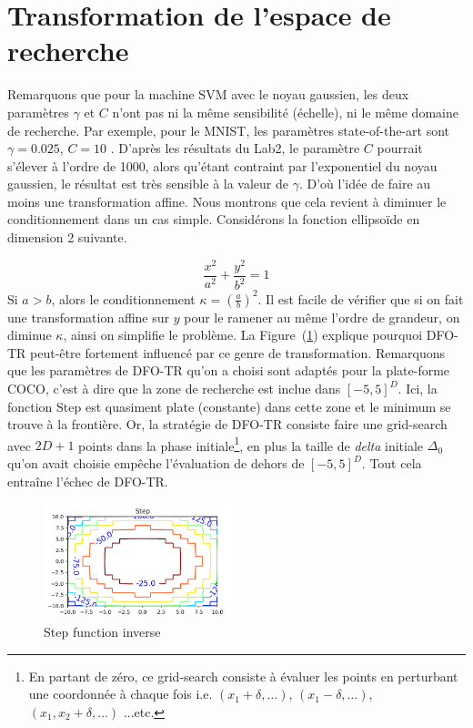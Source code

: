 \documentclass[12 pt, a4paper]{article}
\begin{document}
\section{Transformation de l'espace de recherche}\label{transform}
Remarquons que pour la machine SVM avec le noyau gaussien, les deux paramètres $\gamma$ et $C$ n'ont pas ni la même sensibilité (échelle), ni le même domaine de recherche. Par exemple, pour le MNIST, les paramètres state-of-the-art sont $\gamma = 0.025$, $C = 10$ \cite{results}. D'après les résultats du Lab2, le paramètre $C$ pourrait s'élever à l'ordre de 1000, alors qu'étant contraint par l'exponentiel du noyau gaussien, le résultat est très sensible à la valeur de $\gamma$. D'où l'idée de faire au moins une transformation affine. Nous montrons que cela revient à diminuer le conditionnement dans un cas simple. Considérons la fonction ellipsoïde en dimension 2 suivante. 

\begin{equation*}
\frac{x^2}{a^2} + \frac{y^2}{b^2} = 1
\end{equation*}
Si $a>b$, alors le conditionnement $\kappa = (\frac{a}{b})^2$. Il est facile de vérifier que si on fait une transformation affine sur $y$ pour le ramener au même l'ordre de grandeur, on diminue $\kappa$, ainsi on simplifie le problème. La Figure~(\ref{fig:step}) explique pourquoi DFO-TR peut-être fortement influencé par ce genre de transformation. Remarquons que les paramètres de DFO-TR qu'on a choisi sont adaptés pour la plate-forme COCO, c'est à dire que la zone de recherche est inclue dans $[-5,5]^{D}$. Ici, la fonction Step est quasiment plate (constante) dans cette zone et le minimum se trouve à la frontière. Or, la stratégie de DFO-TR consiste faire une grid-search avec $2D+1$ points dans la phase initiale\footnote{En partant de zéro, ce grid-search consiste à évaluer les points en perturbant une coordonnée à chaque fois i.e. $(x_{1}+\delta, \ldots)$, $(x_{1}-\delta, \ldots)$, $(x_{1}, x_{2}+\delta, \ldots)$ ...etc.}, en plus la taille de \textit{delta} initiale $\Delta_{0}$ qu'on avait choisie empêche l'évaluation de dehors de $[-5,5]^{D}$. Tout cela entraîne l'échec de DFO-TR.

\begin{figure}[h]
\centering
\includegraphics[width = 0.5\textwidth]{Step_function_inverse.png}
\caption{Step function inverse}
\label{fig:step}
\end{figure}
\end{document}
